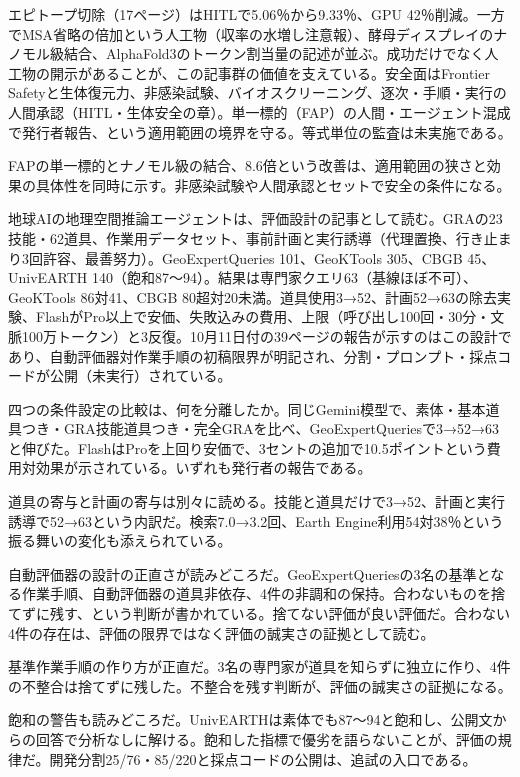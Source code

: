 \documentclass[lualatex,a4paper,10pt]{jlreq}
\begin{document}
エピトープ切除（17ページ）はHITLで5.06％から9.33％、GPU 42％削減。一方でMSA省略の倍加という人工物（収率の水増し注意報）、酵母ディスプレイのナノモル級結合、AlphaFold3のトークン割当量の記述が並ぶ。成功だけでなく人工物の開示があることが、この記事群の価値を支えている。安全面はFrontier Safetyと生体復元力、非感染試験、バイオスクリーニング、逐次・手順・実行の人間承認（HITL・生体安全の章）。単一標的（FAP）の人間・エージェント混成で発行者報告、という適用範囲の境界を守る。等式単位の監査は未実施である。
\cite{B43,B44,B45,B46}


FAPの単一標的とナノモル級の結合、8.6倍という改善は、適用範囲の狭さと効果の具体性を同時に示す。非感染試験や人間承認とセットで安全の条件になる。
\cite{B43,B44,B45,B46}


地球AIの地理空間推論エージェントは、評価設計の記事として読む。GRAの23技能・62道具、作業用データセット、事前計画と実行誘導（代理置換、行き止まり3回許容、最善努力）。GeoExpertQueries 101、GeoKTools 305、CBGB 45、UnivEARTH 140（飽和87〜94）。結果は専門家クエリ63（基線ほぼ不可）、GeoKTools 86対41、CBGB 80超対20未満。道具使用3→52、計画52→63の除去実験、FlashがPro以上で安価、失敗込みの費用、上限（呼び出し100回・30分・文脈100万トークン）と3反復。10月11日付の39ページの報告が示すのはこの設計であり、自動評価器対作業手順の初稿限界が明記され、分割・プロンプト・採点コードが公開（未実行）されている。
\cite{B47,B48}


四つの条件設定の比較は、何を分離したか。同じGemini模型で、素体・基本道具つき・GRA技能道具つき・完全GRAを比べ、GeoExpertQueriesで3→52→63と伸びた。FlashはProを上回り安価で、3セントの追加で10.5ポイントという費用対効果が示されている。いずれも発行者の報告である。
\cite{B47,B48}


道具の寄与と計画の寄与は別々に読める。技能と道具だけで3→52、計画と実行誘導で52→63という内訳だ。検索7.0→3.2回、Earth Engine利用54対38％という振る舞いの変化も添えられている。
\cite{B47,B48}


自動評価器の設計の正直さが読みどころだ。GeoExpertQueriesの3名の基準となる作業手順、自動評価器の道具非依存、4件の非調和の保持。合わないものを捨てずに残す、という判断が書かれている。捨てない評価が良い評価だ。合わない4件の存在は、評価の限界ではなく評価の誠実さの証拠として読む。
\cite{B47,B48}


基準作業手順の作り方が正直だ。3名の専門家が道具を知らずに独立に作り、4件の不整合は捨てずに残した。不整合を残す判断が、評価の誠実さの証拠になる。
\cite{B47,B48}


飽和の警告も読みどころだ。UnivEARTHは素体でも87〜94と飽和し、公開文からの回答で分析なしに解ける。飽和した指標で優劣を語らないことが、評価の規律だ。開発分割25/76・85/220と採点コードの公開は、追試の入口である。
\cite{B47,B48}
\end{document}
